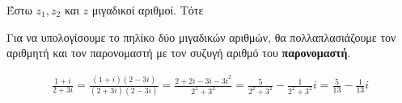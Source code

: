 Έστω $ z_{1}, z_{2} $ και $ z $ μιγαδικοί αριθμοί. Τότε 


\begin{rem}
  Για να υπολογίσουμε το πηλίκο δύο μιγαδικών αριθμών, θα πολλαπλασιάζουμε τον αριθμητή
  και τον παρονομαστή με τον συζυγή αριθμό του \textbf{παρονομαστή}.
\end{rem}
\begin{example}
  \begin{align*}
    \frac{1+i}{2+3i} = \frac{(1+i)(2-3i)}{(2+3i)(2-3i)} =
    \frac{2+2i-3i-3i^{2}}{2^{2}+3^{2}} = \frac{5}{2^{2}+3^{2}} - \frac{1}{2^{2}+3^{2}}i =
    \frac{5}{13} - \frac{1}{13} i
  \end{align*}
\end{example}

